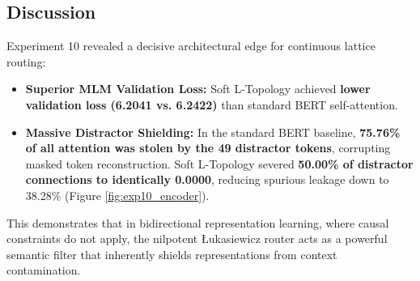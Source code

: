 \subsection{Discussion}
Experiment 10 revealed a decisive architectural edge for continuous lattice routing:
\begin{itemize}
    \item \textbf{Superior MLM Validation Loss:} Soft L-Topology achieved \textbf{lower validation loss (6.2041 vs. 6.2422)} than standard BERT self-attention.
    \item \textbf{Massive Distractor Shielding:} In the standard BERT baseline, \textbf{75.76\% of all attention was stolen by the 49 distractor tokens}, corrupting masked token reconstruction. Soft L-Topology severed \textbf{50.00\% of distractor connections to identically 0.0000}, reducing spurious leakage down to 38.28\% (Figure \ref{fig:exp10_encoder}).
\end{itemize}
This demonstrates that in bidirectional representation learning, where causal constraints do not apply, the nilpotent \L{}ukasiewicz router acts as a powerful semantic filter that inherently shields representations from context contamination.
